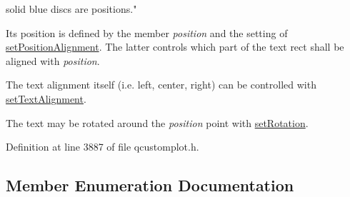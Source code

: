  solid blue discs are positions."

Its position is defined by the member {\itshape position} and the setting of \hyperlink{class_q_c_p_item_text_a781cdf8c640fc6a055dcff1e675c8c7a}{set\+Position\+Alignment}. The latter controls which part of the text rect shall be aligned with {\itshape position}.

The text alignment itself (i.\+e. left, center, right) can be controlled with \hyperlink{class_q_c_p_item_text_ab5bc0684c4d1bed81949a11b34dba478}{set\+Text\+Alignment}.

The text may be rotated around the {\itshape position} point with \hyperlink{class_q_c_p_item_text_a4bcc10cd97952c3f749d75824b5077f0}{set\+Rotation}. 

Definition at line 3887 of file qcustomplot.\+h.



\subsection{Member Enumeration Documentation}
\hypertarget{class_q_c_p_item_text_a14a84e58f72519c8ae1d7a4a1dd23f21}{}
